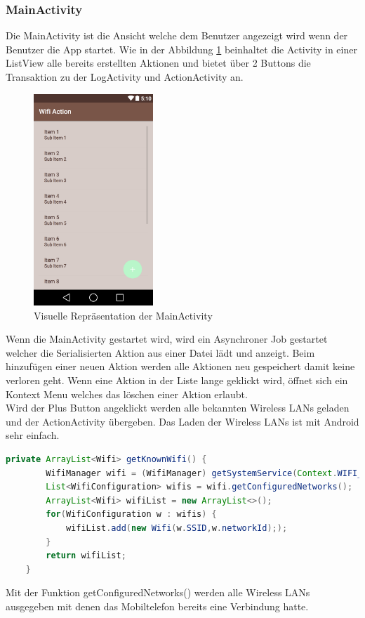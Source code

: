 \subsubsection{MainActivity}
Die MainActivity ist die Ansicht welche dem Benutzer angezeigt wird wenn der Benutzer die App startet. Wie in der Abbildung \ref{fig:mainactivity} beinhaltet die Activity in einer ListView alle bereits erstellten Aktionen und bietet über 2 Buttons die Transaktion zu der LogActivity und ActionActivity an.
\begin{figure}[ht]
	\centering
	\includegraphics[width=0.4\textwidth]{images/mainactivity.png}
	\caption{Visuelle Repräsentation der MainActivity}
	\label{fig:mainactivity}
\end{figure}
Wenn die MainActivity gestartet wird, wird ein Asynchroner Job gestartet welcher die Serialisierten Aktion aus einer Datei lädt und anzeigt. Beim hinzufügen einer neuen Aktion werden alle Aktionen neu gespeichert damit keine verloren geht. Wenn eine Aktion in der Liste lange geklickt wird, öffnet sich ein Kontext Menu welches das löschen einer Aktion erlaubt. \\
Wird der Plus Button angeklickt werden alle bekannten Wireless LANs geladen und der ActionActivity übergeben. Das Laden der Wireless LANs ist mit Android sehr einfach.
\begin{lstlisting}[language=Java]
	private ArrayList<Wifi> getKnownWifi() {
        WifiManager wifi = (WifiManager) getSystemService(Context.WIFI_SERVICE);
        List<WifiConfiguration> wifis = wifi.getConfiguredNetworks();
        ArrayList<Wifi> wifiList = new ArrayList<>();
        for(WifiConfiguration w : wifis) {
            wifiList.add(new Wifi(w.SSID,w.networkId););
        }
        return wifiList;
    }
\end{lstlisting}
Mit der Funktion getConfiguredNetworks() werden alle Wireless LANs ausgegeben mit denen das Mobiltelefon bereits eine Verbindung hatte.

